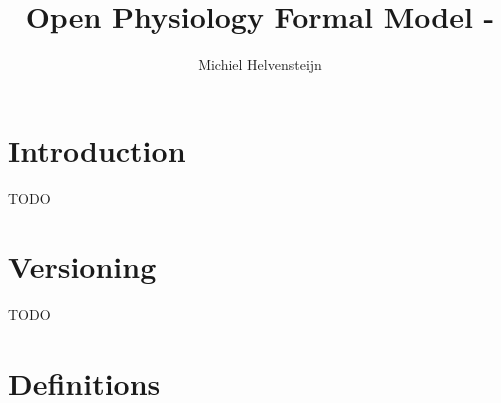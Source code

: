 \documentclass[draft]{article}
\title{Open Physiology Formal Model - \gitRel}
\author{Michiel Helvensteijn}
\begin{document}

\maketitle

\section{Introduction}%

TODO



\section{Versioning}%

TODO



\section{Definitions}%









\end{document}
